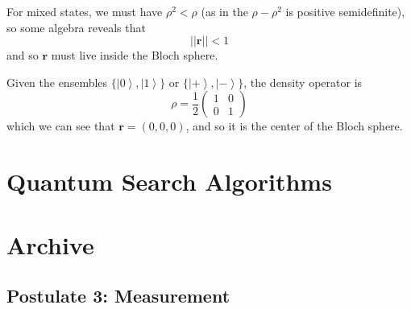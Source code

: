 \documentclass{article}
\newcommand{\ket}[1]{\ensuremath{\left|#1\right\rangle}}
\begin{document}
    For mixed states, we must have $\rho^2 < \rho$ (as in the $\rho - \rho^2$ is positive semidefinite), so some algebra reveals that 
    \begin{equation}
      ||\mathbf{r}|| < 1
    \end{equation}
    and so $\mathbf{r}$ must live inside the Bloch sphere.

    \begin{example}
      Given the ensembles $\{\ket{0}, \ket{1}\}$ or $\{\ket{+}, \ket{-}\}$, the density operator is 
      \begin{equation}
        \rho = \frac{1}{2} \begin{pmatrix} 1 & 0 \\ 0 & 1 \end{pmatrix}
      \end{equation}
      which we can see that $\mathbf{r} = (0, 0, 0)$, and so it is the center of the Bloch sphere. 
    \end{example}

\section{Quantum Search Algorithms}


\section{Archive}

  \subsection{Postulate 3: Measurement}
\end{document}

